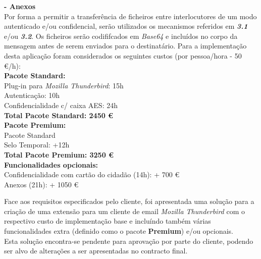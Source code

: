 \documentclass[times, 10pt,twocolumn]{article}
\begin{document}
\noindent \textbf{- Anexos}\\
\indent Por forma a permitir a transfer\^encia de ficheiros entre interlocutores de um modo autenticado e/ou confidencial, ser\~ao utilizados os mecanismos referidos em \emph{\textbf{3.1}} e/ou \emph{\textbf{3.2}}. Os ficheiros ser\~ao codififcados em \emph{Base64} e inclu\'idos no corpo da mensagem antes de serem enviados para o destinat\'ario.
Para a implementa\c{c}\~ao desta aplica\c{c}\~ao foram considerados os seguintes custos (por pessoa/hora - 50 \euro /h):\\

\textbf{Pacote Standard:} \\
\indent \indent Plug-in para \emph{Mozilla Thunderbird}: 15h\\
\indent \indent Autentica\c{c}\~ao: 10h \\
\indent \indent Confidencialidade c/ caixa AES: 24h \\

\textbf{Total Pacote Standard: 2450 \euro} \\

\textbf{Pacote Premium:} \\
 \indent \indent Pacote Standard\\
 \indent \indent Selo Temporal: +12h\\

\textbf{Total Pacote Premium: 3250 \euro} \\

\indent \textbf{Funcionalidades opcionais:}\\
\indent \indent Confidencialidade com cart\~ao do cidad\~ao (14h): + 700 \euro \\
\indent \indent Anexos (21h): + 1050 \euro \\


Face aos requisitos especificados pelo cliente, foi apresentada uma solu\c{c}\~ao para a cria\c{c}\~ao de uma extens\~ao para um cliente de email \emph{Mozilla Thunderbird} com o respectivo custo de implementa\c{c}\~ao base e inclu\'indo tamb\'em v\'arias funcionalidades extra (definido como o pacote \textbf{Premium}) e/ou opcionais.\\
\indent Esta solu\c{c}\~ao encontra-se pendente para aprova\c{c}\~ao por parte do cliente, podendo ser alvo de altera\c{c}\~oes a ser apresentadas no contracto final.
\nocite{ex1,ex2}


\end{document}
